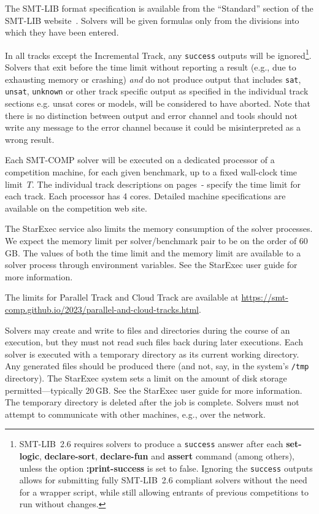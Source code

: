 \documentclass[12pt]{article}
\newcommand{\akey}[1]{\textbf{#1}\xspace}
\newcommand{\inctrack}{Incremental Track\xspace}
\newcommand{\paralleltrack}{Parallel Track\xspace}
\newcommand{\cloudtrack}{Cloud Track\xspace}
\begin{document}
%
The SMT-LIB format specification is available from the ``Standard''
section of the SMT-LIB website~\cite{SMT-LIB}.  Solvers will be given
formulas only from the divisions into which they have been entered.

%
In all tracks except the \inctrack, any \texttt{success} outputs will be
ignored\footnote{SMT-LIB~2.6 requires solvers to produce a \texttt{success}
  answer after each \akey{set-logic}, \akey{declare-sort}, \akey{declare-fun}
  and \akey{assert} command (among others), unless the option
  \akey{:print-success} is set to false.  Ignoring the \texttt{success} outputs
  allows for submitting fully SMT-LIB~2.6 compliant solvers without the need for
  a wrapper script, while still allowing entrants of previous competitions to
  run without changes.}.  Solvers that exit before the time limit without
reporting a result (e.g., due to exhausting memory or crashing) \emph{and} do
not produce output that includes \texttt{sat}, \texttt{unsat}, \texttt{unknown}
or other track specific output as specified in the individual track sections
e.g. unsat cores or models, will be considered to have aborted.  Note that there
is no distinction between output and error channel and tools should not write
any message to the error channel because it could be misinterpreted as a wrong
result.

%
Each SMT-COMP solver will be executed on a dedicated processor of a
competition machine, for each given benchmark, up to a fixed
wall-clock time limit~$T$. The individual track descriptions on
pages~\pageref{sec:exec:single}-\pageref{sec:exec:model} specify
the time limit for each track. Each processor has 4 cores.  Detailed
machine specifications are available on the competition web site.

The StarExec service also limits the memory consumption of the solver
processes.  We expect the memory limit per solver/benchmark pair to be
on the order of 60\,GB.  The values of both the time limit and the
memory limit are available to a solver process through environment
variables.  See the StarExec user guide for more information.

The limits for \paralleltrack{} and \cloudtrack{} are available at
\url{https://smt-comp.github.io/2023/parallel-and-cloud-tracks.html}.

%
Solvers may create and write to files and directories during the
course of an execution, but they must not read such files back during
later executions.  Each solver is executed with a temporary directory
as its current working directory.  Any generated files should be
produced there (and not, say, in the system's \texttt{/tmp}
directory).  The StarExec system sets a limit on the amount of disk
storage permitted---typically 20\,GB.  See the StarExec user guide for
more information.  The temporary directory is deleted after the job is
complete.  Solvers must not attempt to communicate with other
machines, e.g., over the network.
\end{document}
